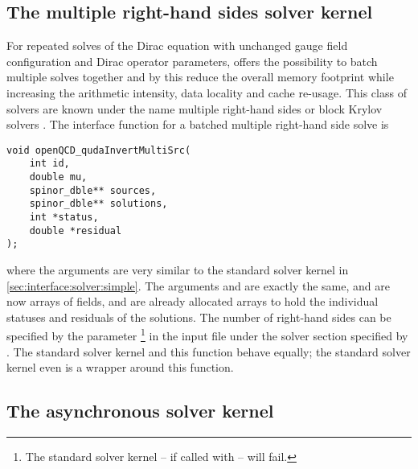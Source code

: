 
\subsection{The multiple right-hand sides solver kernel}
\label{sec:interface:solver:mrhs}

For repeated solves of the Dirac equation with unchanged gauge field configuration and Dirac operator parameters, \quda offers the possibility to batch multiple solves together and by this reduce the overall memory footprint while increasing the arithmetic intensity, data locality and cache re-usage.
This class of solvers are known under the name multiple right-hand sides or block Krylov solvers \cite{Sakurai:2009rb,Nakamura:2011my,Birk:2011jly,Clark:2017ekr,Boyle:2024pio,Richtmann:2016kcq,Boyle:2014rwa}.
The interface function for a batched multiple right-hand side solve is
\begin{verbatim}
void openQCD_qudaInvertMultiSrc(
    int id,
    double mu,
    spinor_dble** sources,
    spinor_dble** solutions,
    int *status,
    double *residual
);
\end{verbatim}
where the arguments are very similar to the standard solver kernel in \cref{sec:interface:solver:simple}. The arguments  and  are exactly the same,  and  are now arrays of  fields,  and  are already allocated arrays to hold the individual statuses and residuals of the solutions. The number of right-hand sides can be specified by the parameter \footnote{The standard solver kernel -- if called with  -- will fail.} in the input file under the solver section specified by . The standard solver kernel and this function behave equally; the standard solver kernel even is a wrapper around this function.

\subsection{The asynchronous solver kernel}
\label{sec:interface:solver:async}

